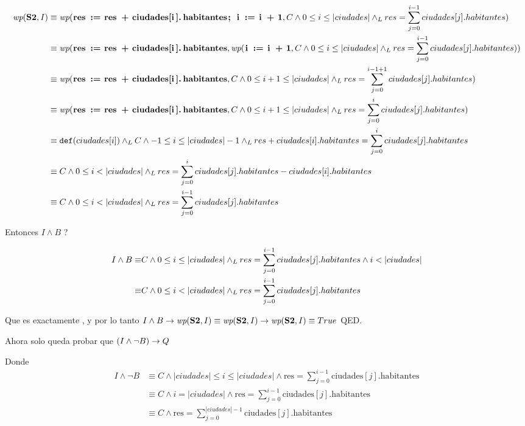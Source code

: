 \documentclass[10pt,a4paper]{article}
\begin{document}
\begin{align*}
	\wp{S2}{I} & \equiv  \wp{ res := res + ciudades[i].habitantes; i := i + 1}{C \land 0 \leq i \leq |ciudades| \yLuego res = \sum_{j=0}^{i-1} ciudades[j].habitantes}      \\
	           & \equiv  \wp{ res := res + ciudades[i].habitantes}{\wp{i := i + 1}{C \land 0 \leq i \leq |ciudades| \yLuego res = \sum_{j=0}^{i-1} ciudades[j].habitantes}} \\
	           & \equiv  \wp{ res := res + ciudades[i].habitantes}{C \land 0 \leq i+1 \leq |ciudades| \yLuego res = \sum_{j=0}^{i-1 + 1} ciudades[j].habitantes}            \\
	           & \equiv  \wp{ res := res + ciudades[i].habitantes}{C \land 0 \leq i+1 \leq |ciudades| \yLuego res = \sum_{j=0}^{i} ciudades[j].habitantes}                  \\
	           & \equiv  \Def{ciudades[i]} \yLuego C \land -1 \leq i \leq |ciudades| -1 \yLuego res + ciudades[i].habitantes = \sum_{j=0}^{i} ciudades[j].habitantes        \\
	           & \equiv  C \land 0 \leq i < |ciudades| \yLuego res = \sum_{j=0}^{i} ciudades[j].habitantes - ciudades[i].habitantes                                         \\
	           & \equiv  C \land 0 \leq i < |ciudades| \yLuego res = \sum_{j=0}^{i-1} ciudades[j].habitantes
\end{align*}


Entonces $\ensuremath{I \land B}$  \implica {}?

\begin{align*}
	{I \land B}  \equiv & C \land 0 \leq i \leq |ciudades|  \land _L res = \sum_{j=0}^{i-1} ciudades[j].habitantes \land i < |ciudades| \\
	\equiv              & C \land 0 \leq i < |ciudades| \land _L res = \sum_{j=0}^{i-1} ciudades[j].habitantes
\end{align*}

Que es exactamente , y por lo tanto $I \land B \Then\wp{S2}{I} \equiv \wp{S2}{I} \Then \wp{S2}{I} \equiv True$ QED.

\bigskip

Ahora solo queda probar que  $(I \land \neg B) \rightarrow Q$

Donde
\begin{align*}
	I \land \neg B & \equiv C \land |ciudades| \leq i \leq |ciudades| \land \text{res} = \sum_{j=0}^{i-1} \text{ciudades}[j].\text{habitantes} \\
	               & \equiv C \land i = |ciudades| \land \text{res} = \sum_{j=0}^{i-1} \text{ciudades}[j].\text{habitantes}                    \\
	               & \equiv C \land \text{res} = \sum_{j=0}^{|ciudades|-1} \text{ciudades}[j].\text{habitantes}                                \\
\end{align*}
\end{document}
